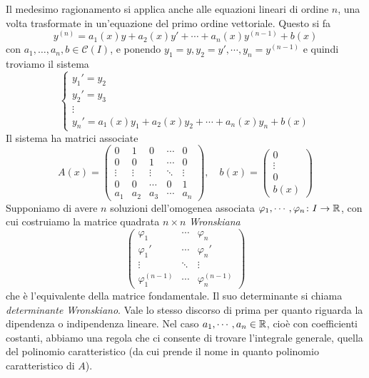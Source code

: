 \documentclass[a4paper]{article}
\begin{document}
\begin{radioactive}
Il medesimo ragionamento si applica
anche alle equazioni lineari di ordine \(n\),
una volta trasformate in un'equazione del primo ordine vettoriale.
Questo si fa
\[
    y^{(n)} = a_1(x)y + a_2(x)y' + \cdots + a_n(x)y^{(n-1)} + b(x)
\]
con \(a_1,\ldots,a_n,b \in \mathcal C(I)\), e ponendo
\(y_1 = y, y_2 = y', \cdots, y_n = y^{(n-1)}\)
e quindi troviamo il sistema
\[
    \begin{cases}
        y_1' = y_2 \\
        y_2' = y_3 \\
        \vdots \\
        y_n' = a_1(x)y_1 + a_2(x)y_2 + \cdots + a_n(x)y_n + b(x)
    \end{cases}
\]
Il sistema ha matrici associate
\[
    A(x) =
    \begin{pmatrix}
        0 & 1 & 0 & \cdots & 0 \\
        0 & 0 & 1 & \cdots & 0 \\
        \vdots & \vdots & \vdots & \ddots & \vdots \\
        0 & 0 & \cdots & 0 & 1 \\
        a_1 & a_2 & a_3 & \cdots & a_n
    \end{pmatrix},
    \quad b(x) =
    \begin{pmatrix}
        0 \\ \vdots \\ 0 \\ b(x)
    \end{pmatrix}
\]
Supponiamo di avere \(n\) soluzioni dell'omogenea associata \(\varphi_1, \cdots, \varphi_n \colon I \to \mathbb{R}\),
con cui costruiamo la matrice quadrata \(n \times n\)
\emph{Wronskiana}
\[
    \begin{pmatrix}
        \varphi_1 & \cdots & \varphi_n \\
        \varphi_1' & \cdots & \varphi_n' \\
        \vdots & \ddots & \vdots \\
        \varphi_1^{(n-1)} & \cdots & \varphi_n^{(n-1)}
    \end{pmatrix}
\]
che è l'equivalente della matrice fondamentale.
Il suo determinante si chiama \emph{determinante Wronskiano}.
Vale lo stesso discorso di prima per quanto riguarda la dipendenza o indipendenza lineare.
Nel caso \(a_1, \cdots, a_n \in \mathbb{R}\),
cioè con coefficienti costanti, abbiamo una regola che ci consente di trovare l'integrale generale,
quella del polinomio caratteristico (da cui prende il nome in quanto polinomio caratteristico di \(A\)).
\end{radioactive}
\end{document}

